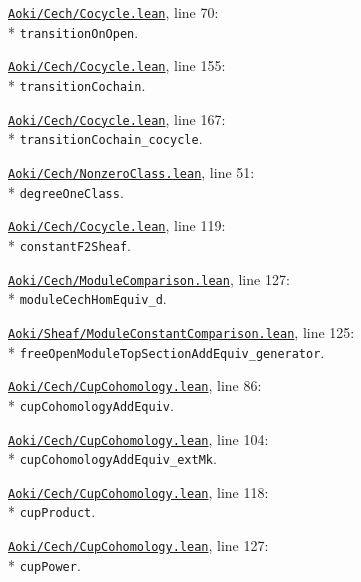 \begin{leansources}
\item \href{../../../lean/Aoki/Cech/Cocycle.lean}{\nolinkurl{Aoki/Cech/Cocycle.lean}}, line 70:\\*
\nolinkurl{transitionOnOpen}.
\item \href{../../../lean/Aoki/Cech/Cocycle.lean}{\nolinkurl{Aoki/Cech/Cocycle.lean}}, line 155:\\*
\nolinkurl{transitionCochain}.
\item \href{../../../lean/Aoki/Cech/Cocycle.lean}{\nolinkurl{Aoki/Cech/Cocycle.lean}}, line 167:\\*
\nolinkurl{transitionCochain_cocycle}.
\item \href{../../../lean/Aoki/Cech/NonzeroClass.lean}{\nolinkurl{Aoki/Cech/NonzeroClass.lean}}, line 51:\\*
\nolinkurl{degreeOneClass}.
\item \href{../../../lean/Aoki/Cech/Cocycle.lean}{\nolinkurl{Aoki/Cech/Cocycle.lean}}, line 119:\\*
\nolinkurl{constantF2Sheaf}.
\end{leansources}

\begin{leansources}
\item \href{../../../lean/Aoki/Cech/ModuleComparison.lean}{\nolinkurl{Aoki/Cech/ModuleComparison.lean}}, line 127:\\*
\nolinkurl{moduleCechHomEquiv_d}.
\item \href{../../../lean/Aoki/Sheaf/ModuleConstantComparison.lean}{\nolinkurl{Aoki/Sheaf/ModuleConstantComparison.lean}}, line 125:\\*
\nolinkurl{freeOpenModuleTopSectionAddEquiv_generator}.
\item \href{../../../lean/Aoki/Cech/CupCohomology.lean}{\nolinkurl{Aoki/Cech/CupCohomology.lean}}, line 86:\\*
\nolinkurl{cupCohomologyAddEquiv}.
\item \href{../../../lean/Aoki/Cech/CupCohomology.lean}{\nolinkurl{Aoki/Cech/CupCohomology.lean}}, line 104:\\*
\nolinkurl{cupCohomologyAddEquiv_extMk}.
\item \href{../../../lean/Aoki/Cech/CupCohomology.lean}{\nolinkurl{Aoki/Cech/CupCohomology.lean}}, line 118:\\*
\nolinkurl{cupProduct}.
\item \href{../../../lean/Aoki/Cech/CupCohomology.lean}{\nolinkurl{Aoki/Cech/CupCohomology.lean}}, line 127:\\*
\nolinkurl{cupPower}.
\end{leansources}

